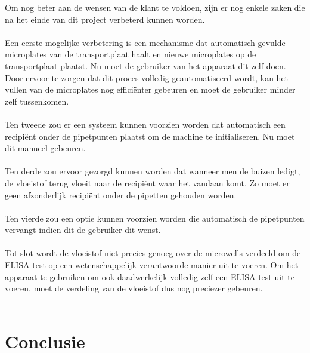 \documentclass[a4paper,twoside,kulak]{kulakreport} %
\begin{document}
Om nog beter aan de wensen van de klant te voldoen, zijn er nog enkele zaken die na het einde van dit project verbeterd kunnen worden. \\ \\
Een eerste mogelijke verbetering is een mechanisme dat automatisch gevulde microplates  van de transportplaat haalt en nieuwe microplates op de transportplaat plaatst. Nu moet de gebruiker van het apparaat dit zelf doen. Door ervoor te zorgen dat dit proces volledig geautomatiseerd wordt, kan het vullen van de microplates nog efficiënter gebeuren en moet de gebruiker minder zelf tussenkomen. \\ \\
Ten tweede zou er een systeem kunnen voorzien worden dat automatisch een recipiënt onder de pipetpunten plaatst om de machine te initialiseren. Nu moet dit manueel gebeuren. \\ \\
Ten derde zou ervoor gezorgd kunnen worden dat wanneer men de buizen ledigt, de vloeistof terug vloeit naar de recipiënt waar het vandaan komt. Zo moet er geen afzonderlijk recipiënt onder de pipetten gehouden worden. \\ \\
Ten vierde zou een optie kunnen voorzien worden die automatisch de pipetpunten vervangt indien dit de gebruiker dit wenst. \\ \\
Tot slot wordt de vloeistof niet precies genoeg over de microwells verdeeld om de ELISA-test op een wetenschappelijk verantwoorde manier uit te voeren. Om het apparaat te gebruiken om ook daadwerkelijk volledig zelf een ELISA-test uit te voeren, moet de verdeling van de vloeistof dus nog preciezer gebeuren. 
\\ \\


\chapter{Conclusie}
\end{document}
